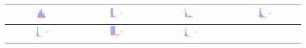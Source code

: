 \begin{table}[!htb]
	\begin{center} 
		\begin{tabular}{ |c|c|c|c| }
         \hline 
         \includegraphics[width=0.21\textwidth]{NOTEBOOK/IMAGENES_BIRCH_DESCRIPTIVAS/1} 
         & \includegraphics[width=0.21\textwidth]{NOTEBOOK/IMAGENES_BIRCH_DESCRIPTIVAS/2} 
         & \includegraphics[width=0.21\textwidth]{NOTEBOOK/IMAGENES_BIRCH_DESCRIPTIVAS/3}
         & \includegraphics[width=0.21\textwidth]{NOTEBOOK/IMAGENES_BIRCH_DESCRIPTIVAS/4} 
         \\  \hline 
         \includegraphics[width=0.21\textwidth]{NOTEBOOK/IMAGENES_BIRCH_DESCRIPTIVAS/5} 
         & \includegraphics[width=0.21\textwidth]{NOTEBOOK/IMAGENES_BIRCH_DESCRIPTIVAS/41} 
         & \includegraphics[width=0.21\textwidth]{NOTEBOOK/IMAGENES_BIRCH_DESCRIPTIVAS/7} 

\end{tabular}
\end{center}
\end{table}
